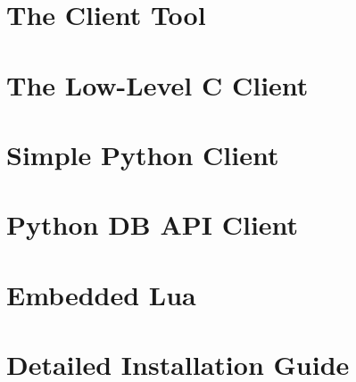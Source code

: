 \documentclass{scrreprt}
\begin{document}
\chapter{The Client Tool}\label{chpt_clienttool}

\chapter{The Low-Level C Client}\label{chpt_llc}


\chapter{Simple Python Client}\label{chpt_pythonclient}


\chapter{Python DB API Client}\label{chpt_papiclient}
% 



\chapter{Embedded Lua}\label{chpt_luaemb}


\chapter{Detailed Installation Guide}\label{chpt_install}
\end{document}
